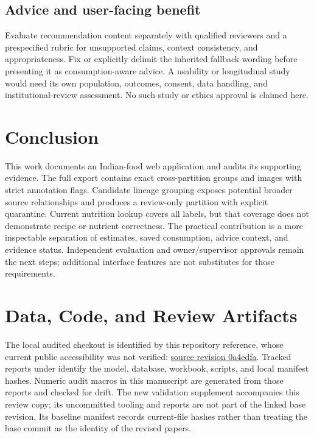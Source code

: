 \documentclass[12pt,journal,draftclsnofoot,onecolumn]{IEEEtran}
\newcommand{\code}[1]{\texttt{\detokenize{#1}}}
\begin{document}
\subsection{Advice and user-facing benefit}
Evaluate recommendation content separately with qualified reviewers and a prespecified rubric for unsupported claims, context consistency, and appropriateness. Fix or explicitly delimit the inherited fallback wording before presenting it as consumption-aware advice. A usability or longitudinal study would need its own population, outcomes, consent, data handling, and institutional-review assessment. No such study or ethics approval is claimed here.

\section{Conclusion}
This work documents an Indian-food web application and audits its supporting evidence. The full export contains \AuditDuplicateGroups{} exact cross-partition groups and \AuditFlaggedImages{} images with strict annotation flags. Candidate lineage grouping exposes potential broader source relationships and produces a review-only partition with explicit quarantine. Current nutrition lookup covers all \AuditClasses{} labels, but that coverage does not demonstrate recipe or nutrient correctness. The practical contribution is a more inspectable separation of estimates, saved consumption, advice context, and evidence status. Independent evaluation and owner/supervisor approvals remain the next steps; additional interface features are not substitutes for those requirements.

\section*{Data, Code, and Review Artifacts}
The local audited checkout is identified by this repository reference, whose current public accessibility was not verified:
\href{https://github.com/jaspreet-jt-singh/Final_Year_Project/tree/0a4edfa92818945ccd7f16b023299c847c745f0d}{source revision 0a4edfa}.
Tracked reports under \code{research/evidence/} identify the model, database, workbook, scripts, and local manifest hashes. Numeric audit macros in this manuscript are generated from those reports and checked for drift. The new validation supplement accompanies this review copy; its uncommitted tooling and reports are not part of the linked base revision. Its baseline manifest records current-file hashes rather than treating the base commit as the identity of the revised papers.
\end{document}
